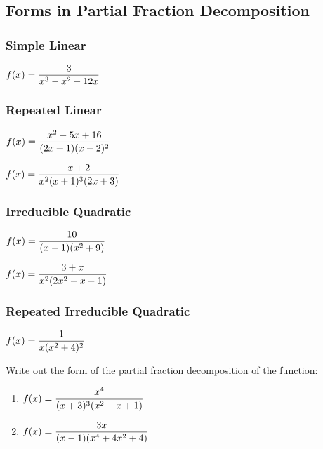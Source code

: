 \documentclass[12pt]{article}
\begin{document}
\newpage

\subsection*{Forms in Partial Fraction Decomposition}

\subsubsection*{ Simple Linear}
\Example $f(x)=\displaystyle\frac{3}{x^3-x^2-12x}$

\vfill

\subsubsection*{ Repeated Linear}
\Example $f(x)=\displaystyle\frac{x^2-5x+16}{(2x+1)(x-2)^2}$

\vfill

\Example $f(x)=\displaystyle\frac{x+2}{x^2(x+1)^3(2x+3)}$

\vfill

\subsubsection*{ Irreducible Quadratic}
\Example $f(x)=\displaystyle\frac{10}{(x-1)(x^2+9)}$

\vfill

\newpage


\Example $f(x)=\displaystyle\frac{3+x}{x^2(2x^2-x-1)}$

\vfill

\subsubsection*{ Repeated Irreducible Quadratic}
\Example $f(x)=\displaystyle\frac{1}{x(x^2+4)^2}$

\vfill

\Example Write out the form of the partial fraction decomposition of the function:
\begin{enumerate}
\item $f(x)=\displaystyle\frac{x^4}{(x+3)^3(x^2-x+1)}$

\vspace{25mm}

\item $f(x)=\displaystyle\frac{3x}{(x-1)(x^4+4x^2+4)}$

\vspace{25mm}

\end{enumerate}
\end{document}
